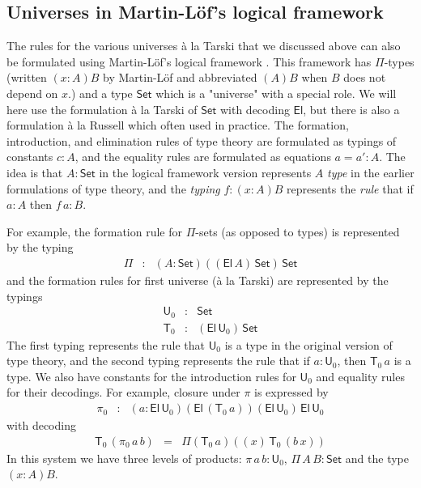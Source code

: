 \documentclass[11pt,a4paper]{article}
\def\UU{\mathsf{U}}
\newcommand{\Set}{\mathsf{Set}}
\newcommand{\El}{\mathsf{El}}
\newcommand{\T}{\mathsf{T}}
\begin{document}
\subsection{Universes in Martin-Löf's logical framework}

The rules for the various universes \`a la Tarski that we discussed above can also be formulated using Martin-Löf's logical framework \cite{Martinlof86,NordstromPS90}. This framework has $\Pi$-types (written $(x : A)B$ by Martin-Löf and abbreviated $(A)B$ when $B$ does not depend on $x$.) and a type $\Set$ which is a "universe" with a special role. We will here use the formulation \`a la Tarski of $\Set$ with decoding $\El$, but there is also a formulation \`a la Russell which often used in practice. The formation, introduction, and elimination rules of type theory are formulated as typings of constants $c : A$, and the equality rules are formulated as equations $a = a' : A$. The idea is that $A : \Set$ in the logical framework version represents $A$ {\em type} in the earlier formulations of type theory, and the {\em typing} $f : (x : A)B$ represents the {\em rule} that if $a : A$ then $f\,a : B$.

For example, the formation rule for $\Pi$-sets (as opposed to types) is represented by the typing
\begin{eqnarray*}
\Pi &:& (A:\Set)((\El\,A)\,\Set)\,\Set
\end{eqnarray*}
and the formation rules for first universe (\`a la Tarski) are represented by the typings
\begin{eqnarray*}
\UU_0 &: &\Set\\
\T_0 &:& (\El\,\UU_0)\,\Set
\end{eqnarray*}
The first typing represents the rule that $\UU_0$ is a type in the original version of type theory, and the second typing represents the rule that if $a : \UU_0$, then $\T_0\,a$ is a type. We also have constants for the introduction rules for $\UU_0$ and equality rules for their decodings. For example, closure under $\pi$ is expressed by
\begin{eqnarray*}
\pi_0 &:& (a:\El\, \UU_0)(\El\, (\T_0\, a))(\El\, \UU_0)\,\El\, \UU_0
\end{eqnarray*}
with decoding
\begin{eqnarray*}
\T_0\, (\pi_0\, a\, b) &=& \Pi (\T_0\, a) ((x)\,\T_0\, (b\, x))
\end{eqnarray*}
In this system we have three levels of products: $\pi\,a\,b : \UU_0$, $\Pi\,A\,B : \Set$ and the type $(x : A)B$.
%
%
%
\end{document}

